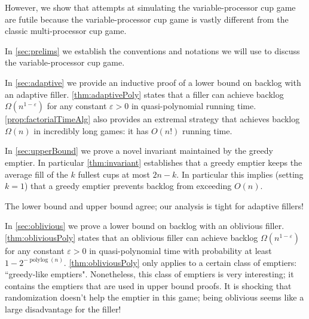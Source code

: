 \documentclass[twocolumn]{article}[10pt]
\renewcommand{\paragraph}[1]{\vspace{0.09in}\noindent{\bf \boldmath #1.}}
\DeclareMathOperator{\polylog}{\text{polylog}}
\begin{document}
However, we show that attempts at simulating the variable-processor cup
game are futile because the variable-processor cup game
is vastly different from the classic multi-processor cup game. 

\paragraph{Outline and Results}
In \cref{sec:prelims} we establish the conventions and
notations we will use to discuss the variable-processor cup game. 

In \cref{sec:adaptive} we provide an inductive proof of a
lower bound on backlog with an adaptive filler.
\cref{thm:adaptivePoly} states that a filler can achieve backlog
$\Omega(n^{1-\varepsilon})$ for any constant $\varepsilon > 0$ in
quasi-polynomial running time. \cref{prop:factorialTimeAlg} also provides an extremal strategy
that achieves backlog $\Omega(n)$ in incredibly long games: it
has $O(n!)$ running time.

In \cref{sec:upperBound} we prove a novel invariant maintained
by the greedy emptier. In particular \cref{thm:invariant} establishes
that a greedy emptier keeps the average fill of the $k$ fullest cups at most
$2n-k$. In particular this implies (setting $k=1$) that a greedy emptier
prevents backlog from exceeding $O(n)$. 

The lower bound and upper bound agree; our analysis is tight for adaptive fillers!

In \cref{sec:oblivious} we prove a lower bound on backlog with an oblivious filler. 
\cref{thm:obliviousPoly} states that an oblivious filler can achieve
backlog $\Omega(n^{1-\varepsilon})$ for any constant $\varepsilon > 0$ in
quasi-polynomial time with probability at least $1-2^{-\polylog(n)}$.
\cref{thm:obliviousPoly} only applies to a certain class of emptiers:
``greedy-like emptiers". Nonetheless, this class of emptiers is very
interesting; it contains the emptiers that are used in upper bound proofs.
It is shocking that randomization doesn't help the emptier in this game;
being oblivious seems like a large disadvantage for the filler!
\end{document}
